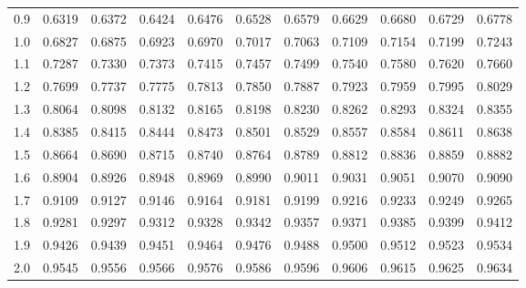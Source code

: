 \documentclass{article}
\begin{document}
\begin{center}
\begin{tabular}{lllllllllll}
0.9 & 0.6319 & 0.6372 & 0.6424 & 0.6476 & 0.6528 & 0.6579 & 0.6629 & 0.6680 & 0.6729 & 0.6778 \\
1.0 & \cellcolor{gray!20}0.6827 & \cellcolor{gray!20}0.6875 & \cellcolor{gray!20}0.6923 & \cellcolor{gray!20}0.6970 & \cellcolor{gray!20}0.7017 & \cellcolor{gray!20}0.7063 & \cellcolor{gray!20}0.7109 & \cellcolor{gray!20}0.7154 & \cellcolor{gray!20}0.7199 & \cellcolor{gray!20}0.7243 \\
1.1 & 0.7287 & 0.7330 & 0.7373 & 0.7415 & 0.7457 & 0.7499 & 0.7540 & 0.7580 & 0.7620 & 0.7660 \\
1.2 & \cellcolor{gray!20}0.7699 & \cellcolor{gray!20}0.7737 & \cellcolor{gray!20}0.7775 & \cellcolor{gray!20}0.7813 & \cellcolor{gray!20}0.7850 & \cellcolor{gray!20}0.7887 & \cellcolor{gray!20}0.7923 & \cellcolor{gray!20}0.7959 & \cellcolor{gray!20}0.7995 & \cellcolor{gray!20}0.8029 \\
1.3 & 0.8064 & 0.8098 & 0.8132 & 0.8165 & 0.8198 & 0.8230 & 0.8262 & 0.8293 & 0.8324 & 0.8355 \\
1.4 & \cellcolor{gray!20}0.8385 & \cellcolor{gray!20}0.8415 & \cellcolor{gray!20}0.8444 & \cellcolor{gray!20}0.8473 & \cellcolor{gray!20}0.8501 & \cellcolor{gray!20}0.8529 & \cellcolor{gray!20}0.8557 & \cellcolor{gray!20}0.8584 & \cellcolor{gray!20}0.8611 & \cellcolor{gray!20}0.8638 \\
1.5 & 0.8664 & 0.8690 & 0.8715 & 0.8740 & 0.8764 & 0.8789 & 0.8812 & 0.8836 & 0.8859 & 0.8882 \\
1.6 & \cellcolor{gray!20}0.8904 & \cellcolor{gray!20}0.8926 & \cellcolor{gray!20}0.8948 & \cellcolor{gray!20}0.8969 & \cellcolor{gray!20}0.8990 & \cellcolor{gray!20}0.9011 & \cellcolor{gray!20}0.9031 & \cellcolor{gray!20}0.9051 & \cellcolor{gray!20}0.9070 & \cellcolor{gray!20}0.9090 \\
1.7 & 0.9109 & 0.9127 & 0.9146 & 0.9164 & 0.9181 & 0.9199 & 0.9216 & 0.9233 & 0.9249 & 0.9265 \\
1.8 & \cellcolor{gray!20}0.9281 & \cellcolor{gray!20}0.9297 & \cellcolor{gray!20}0.9312 & \cellcolor{gray!20}0.9328 & \cellcolor{gray!20}0.9342 & \cellcolor{gray!20}0.9357 & \cellcolor{gray!20}0.9371 & \cellcolor{gray!20}0.9385 & \cellcolor{gray!20}0.9399 & \cellcolor{gray!20}0.9412 \\
1.9 & 0.9426 & 0.9439 & 0.9451 & 0.9464 & 0.9476 & 0.9488 & 0.9500 & 0.9512 & 0.9523 & 0.9534 \\
2.0 & \cellcolor{gray!20}0.9545 & \cellcolor{gray!20}0.9556 & \cellcolor{gray!20}0.9566 & \cellcolor{gray!20}0.9576 & \cellcolor{gray!20}0.9586 & \cellcolor{gray!20}0.9596 & \cellcolor{gray!20}0.9606 & \cellcolor{gray!20}0.9615 & \cellcolor{gray!20}0.9625 & \cellcolor{gray!20}0.9634 \\

\end{tabular}
\end{center}
\end{document}
